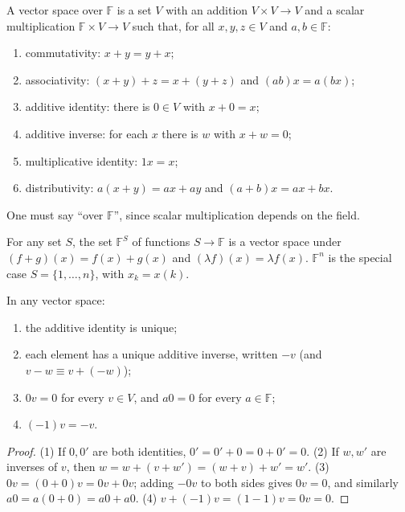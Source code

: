 \begin{definition}
A vector space over $\mathbb{F}$ is a set $V$ with an addition $V\times V\to V$ and a scalar multiplication $\mathbb{F}\times V\to V$ such that, for all $x,y,z\in V$ and $a,b\in\mathbb{F}$:
\begin{enumerate}
    \item commutativity: $x+y = y+x$;
    \item associativity: $(x+y)+z = x+(y+z)$ and $(ab)x = a(bx)$;
    \item additive identity: there is $0\in V$ with $x+0 = x$;
    \item additive inverse: for each $x$ there is $w$ with $x+w = 0$;
    \item multiplicative identity: $1x = x$;
    \item distributivity: $a(x+y) = ax+ay$ and $(a+b)x = ax+bx$.
\end{enumerate}
One must say ``over $\mathbb{F}$'', since scalar multiplication depends on the field.
\end{definition}

\begin{example}
For any set $S$, the set $\mathbb{F}^S$ of functions $S\to\mathbb{F}$ is a vector space under $(f+g)(x) = f(x)+g(x)$ and $(\lambda f)(x) = \lambda f(x)$. $\mathbb{F}^n$ is the special case $S = \{1,\ldots,n\}$, with $x_k = x(k)$.
\end{example}

\begin{theorem}
In any vector space:
\begin{enumerate}
    \item the additive identity is unique;
    \item each element has a unique additive inverse, written $-v$ (and $v-w \equiv v+(-w)$);
    \item $0v = 0$ for every $v\in V$, and $a0 = 0$ for every $a\in\mathbb{F}$;
    \item $(-1)v = -v$.
\end{enumerate}
\end{theorem}
\begin{proof}
(1) If $0,0'$ are both identities, $0' = 0'+0 = 0+0' = 0$. (2) If $w,w'$ are inverses of $v$, then $w = w+(v+w') = (w+v)+w' = w'$. (3) $0v = (0+0)v = 0v+0v$; adding $-0v$ to both sides gives $0v = 0$, and similarly $a0 = a(0+0) = a0+a0$. (4) $v+(-1)v = (1-1)v = 0v = 0$.
\end{proof}

